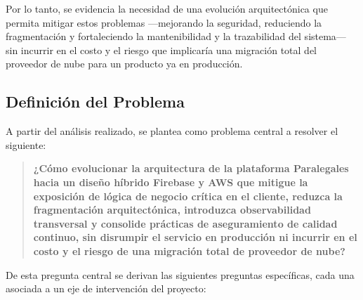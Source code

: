Por lo tanto, se evidencia la necesidad de una evolución arquitectónica que permita mitigar estos problemas —mejorando la seguridad, reduciendo la fragmentación y fortaleciendo la mantenibilidad y la trazabilidad del sistema— sin incurrir en el costo y el riesgo que implicaría una migración total del proveedor de nube para un producto ya en producción.

\subsection{Definición del Problema}
A partir del análisis realizado, se plantea como problema central a resolver el siguiente:
\begin{quote}
  \textbf{¿Cómo evolucionar la arquitectura de la plataforma Paralegales hacia un diseño híbrido Firebase y AWS que mitigue la exposición de lógica de negocio crítica en el cliente, reduzca la fragmentación arquitectónica, introduzca observabilidad transversal y consolide prácticas de aseguramiento de calidad continuo, sin disrumpir el servicio en producción ni incurrir en el costo y el riesgo de una migración total de proveedor de nube?}
\end{quote}

De esta pregunta central se derivan las siguientes preguntas específicas, cada una asociada a un eje de intervención del proyecto:

